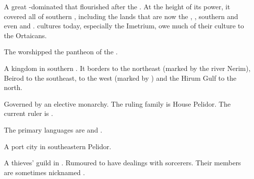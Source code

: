 \begin{gloss}
\begin{comment}
\paragraph{\Ortaica}
\end{comment}
\gitem{\Ortaica}
A great -dominated  that flourished after the . 
At the height of its power, it covered all of southern , including the lands that are now the , , southern  and even  and . 
\Scathaese{} cultures today, especially the Imetrium, owe much of their culture to the Ortaicans. 

The \Ortaicans{} worshipped the pantheon of the . 








\begin{comment}
\paragraph{Pelidor}
\end{comment}

A kingdom in southern . 
It borders  to the northeast (marked by the river Nerim), Beirod to the southeast,  to the west (marked by ) and the Hirum Gulf to the north. 

Governed by an elective monarchy. 
The ruling family is House Pelidor. 
The current ruler is . 

The primary languages are \Tepharin{} and \Velcadian{}. 





\begin{subgloss}
  \begin{comment}
  \subparagraph{Besuld}
  \end{comment}
  A port city in southeastern Pelidor. 
  
  
  
  
  
  \begin{comment}
  \subparagraph{Black Plague}
  \end{comment}
  A thieves' guild in . 
  Rumoured to have dealings with sorcerers. 
  Their members are sometimes nicknamed . 






\end{subgloss}
\end{gloss}
